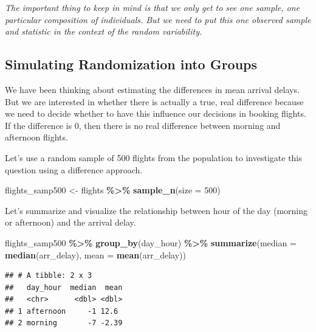 \documentclass[
]{book}
\newenvironment{Shaded}{\begin{snugshade}}{\end{snugshade}}
\newcommand{\AttributeTok}[1]{\textcolor[rgb]{0.13,0.29,0.53}{#1}}
\newcommand{\DecValTok}[1]{\textcolor[rgb]{0.00,0.00,0.81}{#1}}
\newcommand{\FunctionTok}[1]{\textcolor[rgb]{0.13,0.29,0.53}{\textbf{#1}}}
\newcommand{\NormalTok}[1]{#1}
\newcommand{\OtherTok}[1]{\textcolor[rgb]{0.56,0.35,0.01}{#1}}
\newcommand{\SpecialCharTok}[1]{\textcolor[rgb]{0.81,0.36,0.00}{\textbf{#1}}}
\begin{document}
\emph{The important thing to keep in mind is that we only get to see one sample, one particular composition of individuals. But we need to put this one observed sample and statistic in the context of the random variability.}

\subsection{Simulating Randomization into Groups}\label{simulating-randomization-into-groups}

We have been thinking about estimating the differences in mean arrival delays. But we are interested in whether there is actually a true, real difference because we need to decide whether to have this influence our decisions in booking flights. If the difference is 0, then there is no real difference between morning and afternoon flights.

Let's use a random sample of 500 flights from the population to investigate this question using a difference approach.

\begin{Shaded}
\begin{Highlighting}[]
\NormalTok{flights\_samp500 }\OtherTok{\textless{}{-}}\NormalTok{ flights }\SpecialCharTok{\%\textgreater{}\%} 
    \FunctionTok{sample\_n}\NormalTok{(}\AttributeTok{size =} \DecValTok{500}\NormalTok{) }
\end{Highlighting}
\end{Shaded}

Let's summarize and visualize the relationship between hour of the day (morning or afternoon) and the arrival delay.

\begin{Shaded}
\begin{Highlighting}[]
\NormalTok{flights\_samp500 }\SpecialCharTok{\%\textgreater{}\%}
    \FunctionTok{group\_by}\NormalTok{(day\_hour) }\SpecialCharTok{\%\textgreater{}\%}
    \FunctionTok{summarize}\NormalTok{(}\AttributeTok{median =} \FunctionTok{median}\NormalTok{(arr\_delay), }\AttributeTok{mean =} \FunctionTok{mean}\NormalTok{(arr\_delay))}
\end{Highlighting}
\end{Shaded}

\begin{verbatim}
## # A tibble: 2 x 3
##   day_hour  median  mean
##   <chr>      <dbl> <dbl>
## 1 afternoon     -1 12.6 
## 2 morning       -7 -2.39
\end{verbatim}
\end{document}
